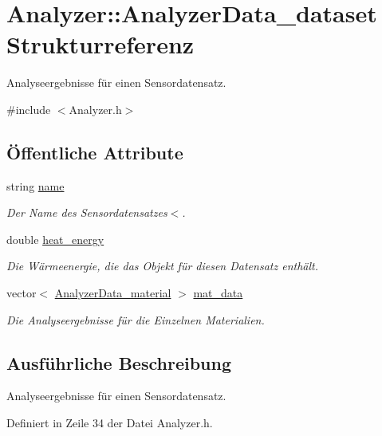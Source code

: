\hypertarget{structAnalyzer_1_1AnalyzerData__dataset}{\section{Analyzer\-:\-:Analyzer\-Data\-\_\-dataset Strukturreferenz}
\label{structAnalyzer_1_1AnalyzerData__dataset}
}


Analyseergebnisse für einen Sensordatensatz.  




{\ttfamily \#include $<$Analyzer.\-h$>$}

\subsection*{Öffentliche Attribute}
\begin{DoxyCompactItemize}
\item 
string \hyperlink{structAnalyzer_1_1AnalyzerData__dataset_a53f3c1896123de4dc00f01e593d5f70d}{name}
\begin{DoxyCompactList}\small\item\em Der Name des Sensordatensatzes$<$. \end{DoxyCompactList}\item 
double \hyperlink{structAnalyzer_1_1AnalyzerData__dataset_aaefb798e2611790d5d956fe597bbafe0}{heat\-\_\-energy}
\begin{DoxyCompactList}\small\item\em Die Wärmeenergie, die das Objekt für diesen Datensatz enthält. \end{DoxyCompactList}\item 
vector$<$ \hyperlink{structAnalyzer_1_1AnalyzerData__material}{Analyzer\-Data\-\_\-material} $>$ \hyperlink{structAnalyzer_1_1AnalyzerData__dataset_a25d0189c93bc0da58f778750edb2a2b9}{mat\-\_\-data}
\begin{DoxyCompactList}\small\item\em Die Analyseergebnisse für die Einzelnen Materialien. \end{DoxyCompactList}\end{DoxyCompactItemize}


\subsection{Ausführliche Beschreibung}
Analyseergebnisse für einen Sensordatensatz. 

Definiert in Zeile 34 der Datei Analyzer.\-h.



